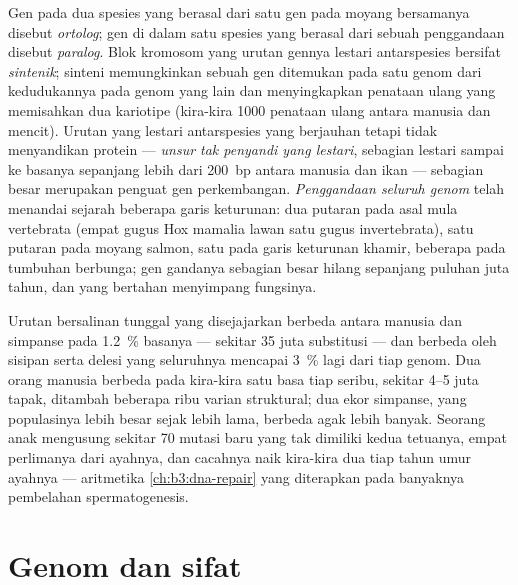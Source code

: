 \begin{definition}\label{def:b3:genomics:comparative}
%
Gen pada dua spesies yang berasal dari satu gen pada moyang bersamanya
disebut \emph{ortolog}; gen di dalam satu spesies yang berasal dari sebuah
penggandaan disebut \emph{paralog}. Blok kromosom yang urutan gennya lestari
antarspesies bersifat \emph{sintenik}; sinteni memungkinkan sebuah gen
ditemukan pada satu genom dari kedudukannya pada genom yang lain dan
menyingkapkan penataan ulang yang memisahkan dua kariotipe (kira-kira
\num{1000} penataan ulang antara manusia dan mencit). Urutan yang lestari
antarspesies yang berjauhan tetapi tidak menyandikan protein ---
\emph{unsur tak penyandi yang lestari}, sebagian lestari sampai ke basanya
sepanjang lebih dari \qty{200}{bp} antara manusia dan ikan --- sebagian besar
merupakan penguat gen perkembangan. \emph{Penggandaan seluruh genom} telah
menandai sejarah beberapa garis keturunan: dua putaran pada asal mula
vertebrata (empat gugus Hox mamalia lawan satu gugus invertebrata), satu
putaran pada moyang salmon, satu pada garis keturunan khamir, beberapa pada
tumbuhan berbunga; gen gandanya sebagian besar hilang sepanjang puluhan juta
tahun, dan yang bertahan menyimpang fungsinya.
\end{definition}

\begin{example}\label{ex:b3:genomics:chimp}
Urutan bersalinan tunggal yang disejajarkan berbeda antara manusia dan
simpanse pada \qty{1.2}{\%} basanya --- sekitar \num{35} juta substitusi ---
dan berbeda oleh sisipan serta delesi yang seluruhnya mencapai
\qty{3}{\%} lagi dari tiap genom. Dua orang manusia berbeda pada kira-kira
satu basa tiap seribu, sekitar \numrange{4}{5} juta tapak, ditambah beberapa
ribu varian struktural; dua ekor simpanse, yang populasinya lebih besar sejak
lebih lama, berbeda agak lebih banyak. Seorang anak mengusung sekitar \num{70}
mutasi baru yang tak dimiliki kedua tetuanya, empat perlimanya dari
ayahnya, dan cacahnya naik kira-kira dua tiap tahun umur ayahnya ---
aritmetika \cref{ch:b3:dna-repair} yang diterapkan pada banyaknya pembelahan
spermatogenesis.
\end{example}

\section{Genom dan sifat}

